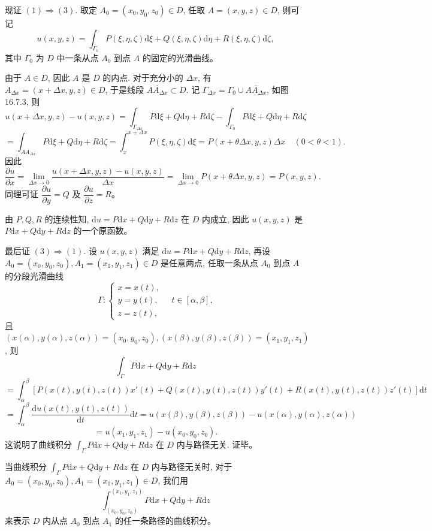 \documentclass[UTF8,12pt,a4paper,fontset=fandol]{ctexart}
\begin{document}
现证 $(1)\Rightarrow(3)$. 取定 $A_0=(x_0,y_0,z_0)\in D$, 任取 $A=(x,y,z)\in D$, 则可记
\[
  u(x,y,z)=\int_{\Gamma_0}P(\xi,\eta,\zeta)\mathrm d\xi
  +Q(\xi,\eta,\zeta)\mathrm d\eta
  +R(\xi,\eta,\zeta)\mathrm d\zeta,
\]
其中 $\Gamma_0$ 为 $D$ 中一条从点 $A_0$ 到点 $A$ 的固定的光滑曲线。

由于 $A\in D$, 因此 $A$ 是 $D$ 的内点. 对于充分小的 $\Delta x$, 有 $A_{\Delta x}=(x+\Delta x,y,z)\in D$, 于是线段 $\overline{AA_{\Delta x}}\subset D$. 记 $\Gamma_{\Delta x}=\Gamma_0\cup\overline{AA_{\Delta x}}$, 如图 16.7.3, 则
\[
  u(x+\Delta x,y,z)-u(x,y,z)
  =
  \int_{\Gamma_{\Delta x}}P\mathrm d\xi+Q\mathrm d\eta+R\mathrm d\zeta
  -\int_{\Gamma_0}P\mathrm d\xi+Q\mathrm d\eta+R\mathrm d\zeta
\]
\[
  =\int_{\overline{AA_{\Delta x}}}P\mathrm d\xi+Q\mathrm d\eta+R\mathrm d\zeta
  =\int_x^{x+\Delta x}P(\xi,\eta,\zeta)\mathrm d\xi
  =P(x+\theta\Delta x,y,z)\Delta x\quad(0<\theta<1).
\]
因此
\[
  \frac{\partial u}{\partial x}
  =\lim_{\Delta x\to0}\frac{u(x+\Delta x,y,z)-u(x,y,z)}{\Delta x}
  =\lim_{\Delta x\to0}P(x+\theta\Delta x,y,z)=P(x,y,z).
\]
同理可证 $\dfrac{\partial u}{\partial y}=Q$ 及 $\dfrac{\partial u}{\partial z}=R$。

由 $P,Q,R$ 的连续性知, $\mathrm du=P\mathrm dx+Q\mathrm dy+R\mathrm dz$ 在 $D$ 内成立, 因此 $u(x,y,z)$ 是 $P\mathrm dx+Q\mathrm dy+R\mathrm dz$ 的一个原函数。

最后证 $(3)\Rightarrow(1)$. 设 $u(x,y,z)$ 满足 $\mathrm du=P\mathrm dx+Q\mathrm dy+R\mathrm dz$, 再设 $A_0=(x_0,y_0,z_0),A_1=(x_1,y_1,z_1)\in D$ 是任意两点, 任取一条从点 $A_0$ 到点 $A$ 的分段光滑曲线
\[
  \Gamma:\begin{cases}
    x=x(t),\\
    y=y(t),\\
    z=z(t),
  \end{cases}\quad t\in[\alpha,\beta],
\]
且 $(x(\alpha),y(\alpha),z(\alpha))=(x_0,y_0,z_0),(x(\beta),y(\beta),z(\beta))=(x_1,y_1,z_1)$, 则
\[
  \int_\Gamma P\mathrm dx+Q\mathrm dy+R\mathrm dz
\]
\[
  =\int_\alpha^\beta
  [P(x(t),y(t),z(t))x'(t)+Q(x(t),y(t),z(t))y'(t)
  +R(x(t),y(t),z(t))z'(t)]\mathrm dt
\]
\[
  =\int_\alpha^\beta\frac{\mathrm du(x(t),y(t),z(t))}{\mathrm dt}\mathrm dt
  =u(x(\beta),y(\beta),z(\beta))-u(x(\alpha),y(\alpha),z(\alpha))
\]
\[
  =u(x_1,y_1,z_1)-u(x_0,y_0,z_0).
\]
这说明了曲线积分 $\int_\Gamma P\mathrm dx+Q\mathrm dy+R\mathrm dz$ 在 $D$ 内与路径无关. 证毕。

当曲线积分 $\int_\Gamma P\mathrm dx+Q\mathrm dy+R\mathrm dz$ 在 $D$ 内与路径无关时, 对于 $A_0=(x_0,y_0,z_0),A_1=(x_1,y_1,z_1)\in D$, 我们用
\[
  \int_{(x_0,y_0,z_0)}^{(x_1,y_1,z_1)}P\mathrm dx+Q\mathrm dy+R\mathrm dz
\]
来表示 $D$ 内从点 $A_0$ 到点 $A_1$ 的任一条路径的曲线积分。
\end{document}
